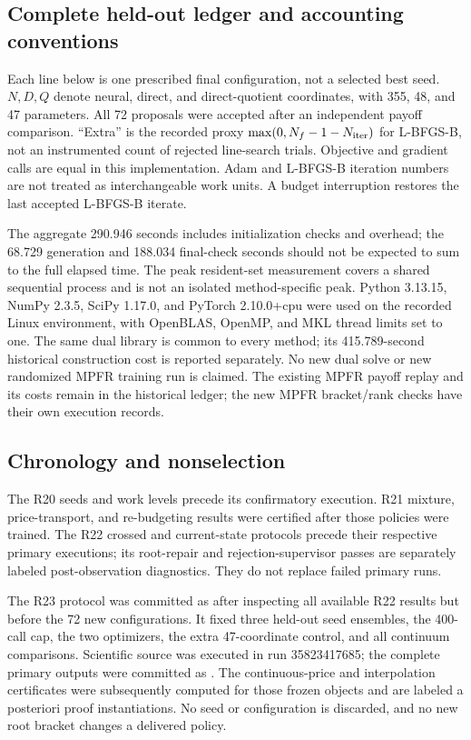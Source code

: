 \subsection{Complete held-out ledger and accounting conventions}
Each line below is one prescribed final configuration, not a selected best seed. $N,D,Q$ denote neural, direct, and direct-quotient coordinates, with 355, 48, and 47 parameters. All 72 proposals were accepted after an independent payoff comparison. ``Extra'' is the recorded proxy $\max(0,N_f-1-N_{\rm iter})$ for L-BFGS-B, not an instrumented count of rejected line-search trials. Objective and gradient calls are equal in this implementation. Adam and L-BFGS-B iteration numbers are not treated as interchangeable work units. A budget interruption restores the last accepted L-BFGS-B iterate.


The aggregate 290.946 seconds includes initialization checks and overhead; the 68.729 generation and 188.034 final-check seconds should not be expected to sum to the full elapsed time. The peak resident-set measurement covers a shared sequential process and is not an isolated method-specific peak. Python 3.13.15, NumPy 2.3.5, SciPy 1.17.0, and PyTorch 2.10.0+cpu were used on the recorded Linux environment, with OpenBLAS, OpenMP, and MKL thread limits set to one. The same dual library is common to every method; its 415.789-second historical construction cost is reported separately. No new dual solve or new randomized MPFR training run is claimed. The existing MPFR payoff replay and its costs remain in the historical ledger; the new MPFR bracket/rank checks have their own execution records.

\subsection{Chronology and nonselection}
The R20 seeds and work levels precede its confirmatory execution. R21 mixture, price-transport, and re-budgeting results were certified after those policies were trained. The R22 crossed and current-state protocols precede their respective primary executions; its root-repair and rejection-supervisor passes are separately labeled post-observation diagnostics. They do not replace failed primary runs.

The R23 protocol was committed as  after inspecting all available R22 results but before the 72 new configurations. It fixed three held-out seed ensembles, the 400-call cap, the two optimizers, the extra 47-coordinate control, and all continuum comparisons. Scientific source  was executed in run 35823417685; the complete primary outputs were committed as . The continuous-price and interpolation certificates were subsequently computed for those frozen objects and are labeled a posteriori proof instantiations. No seed or configuration is discarded, and no new root bracket changes a delivered policy.

